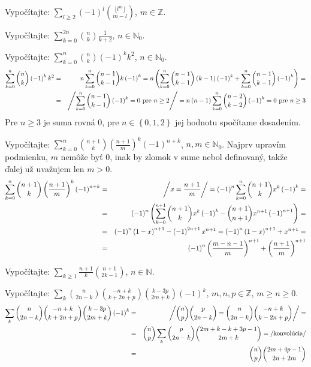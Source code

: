 \pr Vypočítajte: $\sum_{l\geq 2}\left(-1\right)^l{\lfloor l^m \rfloor \choose m-l}$, $m\in\mathbb{Z}$.

\pr Vypočítajte: $\sum_{k=0}^{2n}{n \choose k}\frac1{k+2}$, $n\in\mathbb{N}_0$.

\pr Vypočítajte: $\sum_{k=0}^{n}{n \choose k}\left(-1\right)^k k^2$, $n\in\mathbb{N}_0$.
\begin{eqnarray*}
\sum_{k=0}^{n}{n \choose k}\left(-1\right)^k k^2 &=& n\sum_{k=0}^n {n-1 \choose k-1} k \left(-1\right)^k = n\left(\sum_{k=0}^n {n-1 \choose k-1} \left(k-1\right) \left(-1\right)^k + \sum_{k=0}^n {n-1 \choose k-1} \left(-1\right)^k \right) = \\
&=& \left/ \sum_{k=0}^n {n-1 \choose k-1} \left(-1\right)^k = 0 \hbox{ pre } n\geq2\right/ = n\left(n-1\right)\sum_{k=0}^n{n-2 \choose k-2}\left(-1\right)^k = 0 \hbox{ pre } n\geq3
\end{eqnarray*}
Pre $n\geq3$ je suma rovná $0$, pre $n\in\left\{0,1,2\right\}$ jej hodnotu spočítame dosadením.

\pr Vypočítajte: $\sum_{k=0}^{n}{n+1 \choose k}\left(\frac{n+1}m\right)^k \left(-1\right)^{n+k}$, $n,m\in\mathbb{N}_0$.
 Najprv upravím podmienku, $m$ nemôže byť $0$, inak by zlomok v sume nebol definovaný, takže ďalej už uvažujem len $m>0$.
\begin{eqnarray*}
\sum_{k=0}^{n}{n+1 \choose k}\left(\frac{n+1}m\right)^k \left(-1\right)^{n+k} &=& \left/ x = \frac{n+1}m \right/ = \left(-1\right)^n\sum_{k=0}^n{n+1 \choose k}x^k\left(-1\right)^k =\\
&=& \left(-1\right)^n\left(\sum_{k=0}^{n+1}{n+1 \choose k}x^k\left(-1\right)^k - {n+1 \choose n+1}x^{n+1}\left(-1\right)^{n+1}\right) = \\
&=& \left(-1\right)^n\left(1-x\right)^{n+1} - \left(-1\right)^{2n+1}x^{n+1} = \left(-1\right)^n\left(1-x\right)^{n+1}+x^{n+1} = \\
&=& \left(-1\right)^n\left(\frac{m-n-1}m\right)^{n+1}+\left(\frac{n+1}m\right)^{n+1}
\end{eqnarray*}

\pr Vypočítajte: $\sum_{k\geq1}\frac{n+1}k{n+1 \choose 2k-1}$, $n\in\mathbb{N}$.

\pr Vypočítajte: $\sum_k{n \choose 2n-k}{-n+k \choose k+2n+p}{k-3p \choose 2m+k}\left(-1\right)^k$, $m,n,p\in\mathbb{Z}$, $m\geq n\geq 0$.
\begin{eqnarray*}
\sum_k{n \choose 2n-k}{-n+k \choose k+2n+p}{k-3p \choose 2m+k}\left(-1\right)^k &=& \left/ {n \choose p}{p \choose 2n-k} = {n \choose 2n-k}{-n+k \choose k-2n+p}\right/ = \\
&=& {n \choose p}\sum_k{p \choose 2n-k}{2m+k-k+3p-1 \choose 2m+k} = \left/\hbox{konvolúcia}\right/\\
&=& {n \choose p}{2m+4p-1 \choose 2n+2m}
\end{eqnarray*}

